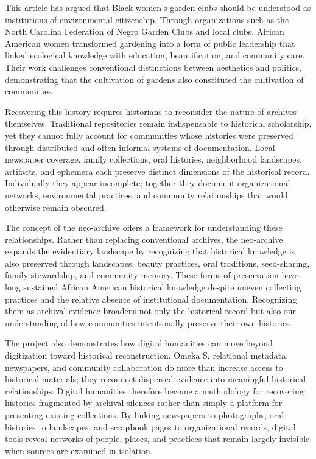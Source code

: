 \documentclass[final]{anthology-ch}
\begin{document}
This article has argued that Black women's garden clubs should be understood as institutions of environmental citizenship. Through organizations such as the North Carolina Federation of Negro Garden Clubs and local clubs, African American women transformed gardening into a form of public leadership that linked ecological knowledge with education, beautification, and community care. Their work challenges conventional distinctions between aesthetics and politics, demonstrating that the cultivation of gardens also constituted the cultivation of communities.

Recovering this history requires historians to reconsider the nature of archives themselves. Traditional repositories remain indispensable to historical scholarship, yet they cannot fully account for communities whose histories were preserved through distributed and often informal systems of documentation. Local newspaper coverage, family collections, oral histories, neighborhood landscapes, artifacts, and ephemera each preserve distinct dimensions of the historical record. Individually they appear incomplete; together they document organizational networks, environmental practices, and community relationships that would otherwise remain obscured.

The concept of the neo-archive offers a framework for understanding these relationships. Rather than replacing conventional archives, the neo-archive expands the evidentiary landscape by recognizing that historical knowledge is also preserved through landscapes, beauty practices, oral traditions, seed-sharing, family stewardship, and community memory. These forms of preservation have long sustained African American historical knowledge despite uneven collecting practices and the relative absence of institutional documentation. Recognizing them as archival evidence broadens not only the historical record but also our understanding of how communities intentionally preserve their own histories.

The project also demonstrates how digital humanities can move beyond digitization toward historical reconstruction. Omeka S, relational metadata, newspapers, and community collaboration do more than increase access to historical materials; they reconnect dispersed evidence into meaningful historical relationships. Digital humanities therefore become a methodology for recovering histories fragmented by archival silences rather than simply a platform for presenting existing collections. By linking newspapers to photographs, oral histories to landscapes, and scrapbook pages to organizational records, digital tools reveal networks of people, places, and practices that remain largely invisible when sources are examined in isolation.
\end{document}

